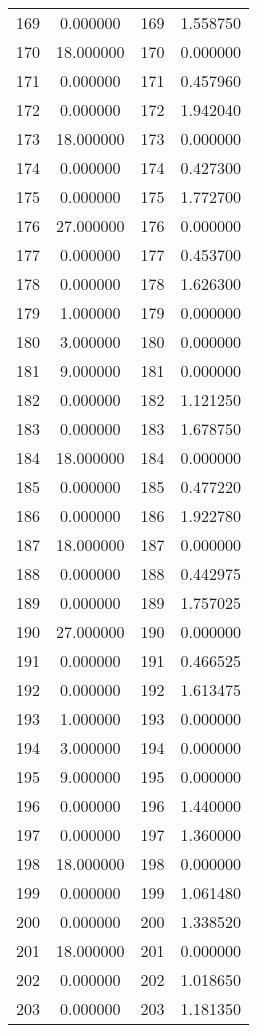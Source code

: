 \documentclass[12pt]{article}
\begin{document}
\begin{longtable}{@{}cccc@{}}
169 & 0.000000 & 169 & 1.558750 \\
170 & 18.000000 & 170 & 0.000000 \\
171 & 0.000000 & 171 & 0.457960 \\
172 & 0.000000 & 172 & 1.942040 \\
173 & 18.000000 & 173 & 0.000000 \\
174 & 0.000000 & 174 & 0.427300 \\
175 & 0.000000 & 175 & 1.772700 \\
176 & 27.000000 & 176 & 0.000000 \\
177 & 0.000000 & 177 & 0.453700 \\
178 & 0.000000 & 178 & 1.626300 \\
179 & 1.000000 & 179 & 0.000000 \\
180 & 3.000000 & 180 & 0.000000 \\
181 & 9.000000 & 181 & 0.000000 \\
182 & 0.000000 & 182 & 1.121250 \\
183 & 0.000000 & 183 & 1.678750 \\
184 & 18.000000 & 184 & 0.000000 \\
185 & 0.000000 & 185 & 0.477220 \\
186 & 0.000000 & 186 & 1.922780 \\
187 & 18.000000 & 187 & 0.000000 \\
188 & 0.000000 & 188 & 0.442975 \\
189 & 0.000000 & 189 & 1.757025 \\
190 & 27.000000 & 190 & 0.000000 \\
191 & 0.000000 & 191 & 0.466525 \\
192 & 0.000000 & 192 & 1.613475 \\
193 & 1.000000 & 193 & 0.000000 \\
194 & 3.000000 & 194 & 0.000000 \\
195 & 9.000000 & 195 & 0.000000 \\
196 & 0.000000 & 196 & 1.440000 \\
197 & 0.000000 & 197 & 1.360000 \\
198 & 18.000000 & 198 & 0.000000 \\
199 & 0.000000 & 199 & 1.061480 \\
200 & 0.000000 & 200 & 1.338520 \\
201 & 18.000000 & 201 & 0.000000 \\
202 & 0.000000 & 202 & 1.018650 \\
203 & 0.000000 & 203 & 1.181350 \\

\end{longtable}
\end{document}
